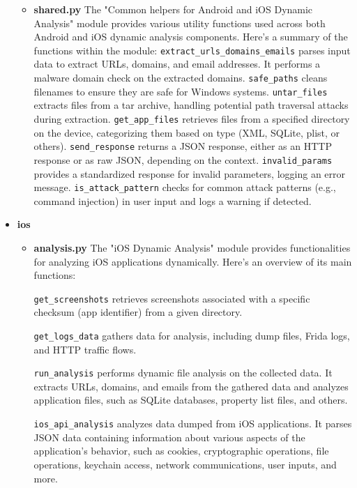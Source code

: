 \documentclass{report}
\begin{document}
\begin{itemize}
\begin{itemize}
        \item \textbf{shared.py}
        The "Common helpers for Android and iOS Dynamic Analysis" module provides various utility functions used across both Android and iOS dynamic analysis components. Here's a summary of the functions within the module: \newline
        \texttt{extract\_urls\_domains\_emails} parses input data to extract URLs, domains, and email addresses. It performs a malware domain check on the extracted domains.
        \texttt{safe\_paths} cleans filenames to ensure they are safe for Windows systems.
        \texttt{untar\_files} extracts files from a tar archive, handling potential path traversal attacks during extraction.
        \texttt{get\_app\_files} retrieves files from a specified directory on the device, categorizing them based on type (XML, SQLite, plist, or others).
        \texttt{send\_response} returns a JSON response, either as an HTTP response or as raw JSON, depending on the context.
        \texttt{invalid\_params} provides a standardized response for invalid parameters, logging an error message.  
        \texttt{is\_attack\_pattern} checks for common attack patterns (e.g., command injection) in user input and logs a warning if detected.
    \end{itemize}
    \item\textbf{ios}
    \begin{itemize}
        \item \textbf {analysis.py}
        The "iOS Dynamic Analysis" module provides functionalities for analyzing iOS applications dynamically. Here's an overview of its main functions:

        \texttt{get\_screenshots} retrieves screenshots associated with a specific checksum (app identifier) from a given directory.
        
        \texttt{get\_logs\_data} gathers data for analysis, including dump files, Frida logs, and HTTP traffic flows.
        
        \texttt{run\_analysis} performs dynamic file analysis on the collected data. It extracts URLs, domains, and emails from the gathered data and analyzes application files, such as SQLite databases, property list files, and others.
        
        \texttt{ios\_api\_analysis} analyzes data dumped from iOS applications. It parses JSON data containing information about various aspects of the application's behavior, such as cookies, cryptographic operations, file operations, keychain access, network communications, user inputs, and more.
        

\end{itemize}
\end{itemize}
\end{document}
